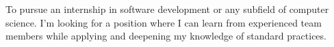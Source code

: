 

\begin{cvparagraph}

To pursue an internship in software development or any subfield of computer science. 
I'm looking for a position where I can learn from experienced team
members while applying and deepening my knowledge of standard practices.
\end{cvparagraph}
